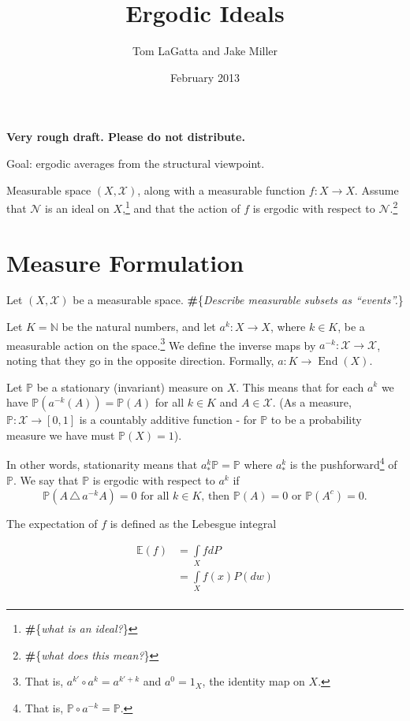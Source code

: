 \documentclass[letterpaper,10pt,oneside,onecolumn,reqno]{amsart}
\author{Tom LaGatta and Jake Miller}
\title{Ergodic Ideals}
\date{February 2013}
\newcommand{\E}{\mathbb E}
\newcommand{\N}{\mathcal N}
\newcommand{\NN}{\mathbb N}
\renewcommand{\P}{\mathbb P}
\newcommand{\X}{\mathcal X}
\renewcommand{\d}{\mathrm{d}}				%
\theoremstyle{definition}
\newcommand{\End}{\operatorname{End}}
\newcommand{\tom}[1]{{\textbf{\color{ForestGreen}\#}{\color{ForestGreen}\{\emph{#1}\}}}}
\begin{document}
\maketitle

	\textbf{Very rough draft. Please do not distribute.}

	Goal: ergodic averages from the structural viewpoint. 

	Measurable space $(X, \X)$, along with a measurable function $f : X \to X$. Assume that $\N$ is an ideal on $X$,\footnote{\tom{what is an ideal?}} and that the action of $f$ is ergodic with respect to $\N$.\footnote{\tom{what does this mean?}}
	
	
	

	\section{Measure Formulation}

	Let $(X,\X)$ be a measurable space. \tom{Describe measurable subsets as ``events''.}
	
	Let $K = \NN$ be the natural numbers, and let $a^k : X \to X$, where $k \in K$, be a measurable action on the space.\footnote{That is, $a^{k'} \circ a^k = a^{k' + k}$ and $a^{0} = 1_X$, the identity map on $X$.} We define the inverse maps by $a^{-k} : \X \to \X$, noting that they go in the opposite direction. Formally, $a : K \to \End(X)$. 
	
	
	
	Let $\P$ be a stationary (invariant) measure on $X$. This means that for each $a^{k}$ we have $\P(a^{-k}(A)) = \P(A)$ for all $k \in K$ and $A \in \X$.  (As a measure, $\P : \X \to [0,1]$ is a countably additive function - for $\P$ to be a probability measure we have must $\P(X) = 1$).
	
	In other words, stationarity means that $a^k_* \P = \P$ where $a_{*}^k$ is the pushforward\footnote{That is, $\P \circ a^{-k} = \P$.} of $\P$. We say that $\P$ is ergodic with respect to $a^k$ if
		$$\mbox{$\P( A \,\triangle\, a^{-k} A ) = 0$ for all $k \in K$, then $\P(A) = 0$ or $\P(A^c) = 0$.}$$

The expectation of $f$ is defined as the Lebesgue integral 

\begin{align*}
\E(f) &= \int\limits_{X}fdP \\
&= \int\limits_{X}f(x)P(dw) \\
\end{align*}
\end{document}
